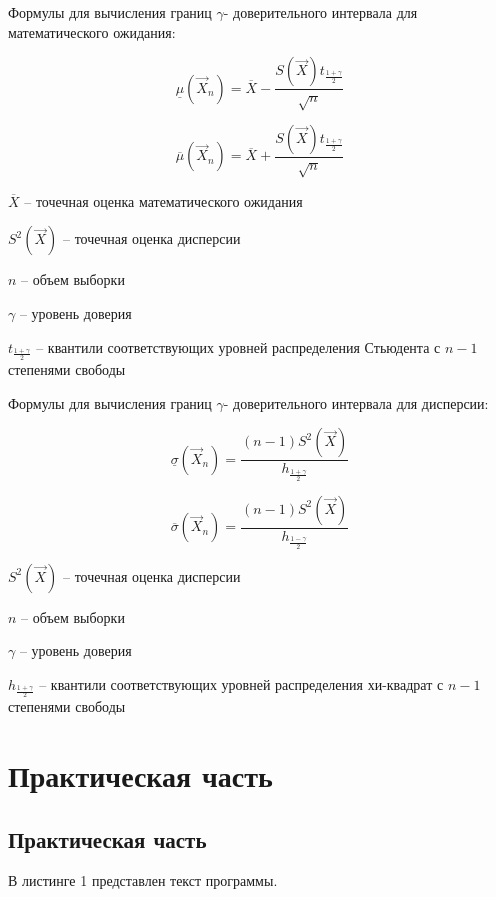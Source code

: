 \documentclass[a4paper, 12pt]{article}
\theoremstyle{definition}
\begin{document}
Формулы для вычисления границ $\gamma$- доверительного интервала для математического ожидания:

$$
\underline\mu(\vec X_n)=\overline X - \frac{S(\vec X)t_{\frac{1+\gamma}{2}}}{\sqrt{n}}
$$

$$
\overline\mu(\vec X_n)=\overline X + \frac{S(\vec X)t_{\frac{1+\gamma}{2}}}{\sqrt{n}}
$$

$\overline X$ -- точечная оценка математического ожидания

$S^2(\vec X)$ -- точечная оценка дисперсии

$n$ -- объем выборки

$\gamma$ -- уровень доверия

$t_{\frac{1+\gamma}{2}}$ -- квантили соответствующих уровней распределения Стьюдента с $n - 1$ степенями свободы

Формулы для вычисления границ $\gamma$- доверительного интервала для дисперсии:

$$
\underline\sigma(\vec X_n)= \frac{(n-1)S^2(\vec X)}{h_{\frac{1+\gamma}{2}}}
$$

$$
\overline\sigma(\vec X_n)= \frac{(n-1)S^2(\vec X)}{h_{\frac{1-\gamma}{2}}}
$$

$S^2(\vec X)$ -- точечная оценка дисперсии

$n$ -- объем выборки

$\gamma$ -- уровень доверия

$h_{\frac{1+\gamma}{2}}$ -- квантили соответствующих уровней распределения хи-квадрат с $n - 1$ степенями свободы

\newpage
\section{Практическая часть}

\subsection{Практическая часть}

В листинге 1 представлен текст программы.
\end{document}
